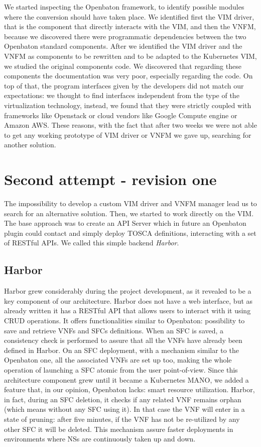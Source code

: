 We started inspecting the Openbaton framework, to identify possible modules
where the conversion should have taken place. We identified first the VIM
driver, that is the component that directly interacts with the VIM, and then the
VNFM, because we discovered there were programmatic dependencies between the two
Openbaton standard components. After we identified the VIM driver and the VNFM
as components to be rewritten and to be adapted to the Kubernetes VIM, we
studied the original components code. We discovered that regarding these
components the documentation was very poor, especially regarding the code. On
top of that, the program interfaces given by the developers did not match our
expectations: we thought to find interfaces independent from the type of the
virtualization technology, instead, we found that they were strictly coupled
with frameworks like Openstack or cloud vendors like Google Compute engine or
Amazon AWS. These reasons, with the fact that after two weeks we were not able
to get any working prototype of VIM driver or VNFM we gave up, searching for
another solution.

\section{Second attempt - revision one}

The impossibility to develop a custom VIM driver and VNFM manager lead us to
search for an alternative solution. Then, we started to work directly on the
VIM. The base approach was to create an API Server which in future an Openbaton
plugin could contact and simply deploy TOSCA definitions, interacting with a set
of RESTful APIs. We called this simple backend \emph{Harbor}.

\subsection{Harbor}
\label{chap:archimpl:sec:secondattempt:sub:harbor}
Harbor grew considerably during the project development, as it revealed to be a
key component of our architecture. Harbor does not have a web interface, but as
already written it has a RESTful API that allows users to interact with it using
CRUD operations. It offers functionalities similar to Openbaton: possibility to
save and retrieve VNFs and SFCs definitions. When an SFC is saved, a consistency
check is performed to assure that all the VNFs have already been defined in
Harbor. On an SFC deployment, with a mechanism similar to the Openbaton one, all
the associated VNFs are set up too, making the whole operation of launching a
SFC atomic from the user point-of-view. Since this architecture component grew
until it became a Kubernetes MANO, we added a feature that, in our opinion,
Openbaton lacks: smart resource utilization. Harbor, in fact, during an SFC
deletion, it checks if any related VNF remains orphan (which means without any
SFC using it). In that case the VNF will enter in a state of pruning: after five
minutes, if the VNF has not be re-utilized by any other SFC it will be deleted.
This mechanism assure faster deployments in environments where NSs are
continuously taken up and down.


